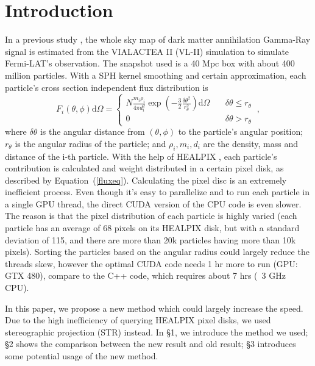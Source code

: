 \section*{Introduction}
In a previous study \citet{Kuhlen:2008kr}, the whole sky map of dark matter annihilation Gamma-Ray signal is estimated from the VIALACTEA II (VL-II) simulation to simulate Fermi-LAT's observation. The snapshot used is a 40 Mpc box with about 400 million particles. With a SPH kernel smoothing and certain approximation, each particle's cross section independent flux distribution is
\begin{equation}\label{fluxeq}
	F_i(\theta,\phi)\mathrm{d}\Omega = 
	\left\{\begin{aligned}
		N\frac{m_i\rho_i}{4\pi d_i^2} \exp\left(-\frac{3}2\frac{\delta\theta^2}{r_\theta^2}\right)\mathrm{d}\Omega  &\  & \delta\theta \le r_\theta \\
		0	&\   & \delta\theta > r_\theta\
	\end{aligned}\right. ,
\end{equation}
where $\delta\theta$ is the angular distance from $(\theta, \phi)$ to the particle's angular position; $r_\theta$ is the angular radius of the particle; and $\rho_i, m_i, d_i$ are the density, mass and distance of the i-th particle. With the help of HEALPIX \citep{Gorski:2005ku}, each particle's contribution is calculated and weight distributed in a certain pixel disk, as described by Equation~(\ref{fluxeq}). Calculating the pixel disc is an extremely inefficient process. Even though it's easy to parallelize and to run each particle in a single GPU thread, the direct CUDA version of the CPU code is even slower. The reason is that the pixel distribution of each particle is highly varied (each particle has an average of 68 pixels on its HEALPIX disk, but with a standard deviation of 115, and there are more than 20k particles having more than 10k pixels). Sorting the particles based on the angular radius could largely reduce the threads skew, however the optimal CUDA code needs 1 hr more to run (GPU: GTX 480), compare to the C++ code, which requires about 7 hrs (~3 GHz CPU). 

In this paper, we propose a new method which could largely increase the speed. Due to the high inefficiency of querying HEALPIX pixel disks, we used stereographic projection (STR) instead. In \S 1, we introduce the method we used; \S 2 shows the comparison between the new result and old result; \S 3 introduces some potential usage of the new method.


